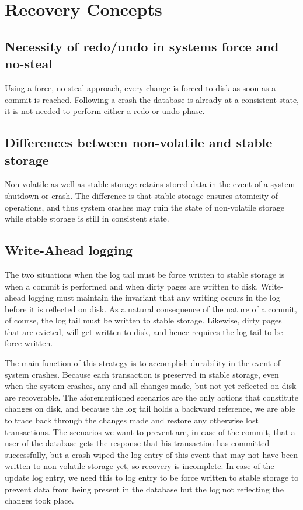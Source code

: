 
\section{Recovery Concepts}

\subsection{Necessity of redo/undo in systems force and no-steal}
Using a force, no-steal approach, every change is forced to disk as soon as a commit is reached. Following a
crash the database is already at a consistent state, it is not needed to
perform either a redo or undo phase.

\subsection{Differences between non-volatile and stable storage}

Non-volatile as well as stable storage retains stored data in the event of a
system shutdown or crash. The difference is that stable storage ensures
atomicity of operations, and thus system crashes may ruin the state of
non-volatile storage while stable storage is still in consistent state.

\subsection{Write-Ahead logging}

The two situations when the log tail must be force written to stable storage
is when a commit is performed and when dirty pages are written to disk.
Write-ahead logging must maintain the invariant that any writing occurs in the
log before it is reflected on disk. As a natural consequence of the nature of
a commit, of course, the log tail must be written to stable storage. Likewise,
dirty pages that are evicted, will get written to disk, and hence requires the
log tail to be force written.

The main function of this strategy is to accomplish durability in the event of
system crashes. Because each transaction is preserved in stable storage, even
when the system crashes, any and all changes made, but not yet reflected on disk
are recoverable. The aforementioned scenarios are the only actions that constitute
changes on disk, and because the log tail holds a backward reference, we are
able to trace back through the changes made and restore any otherwise lost
transactions. The scenarios we want to prevent are, in case of the commit, that a user of the database gets the response that his transaction has committed successfully, but a crash wiped the log entry of this event that may not have been written to non-volatile storage yet, so recovery is incomplete. In case of the update log entry, we need this to log entry to be force written to stable storage to prevent data from being present in the database but the log not reflecting the changes took place.

